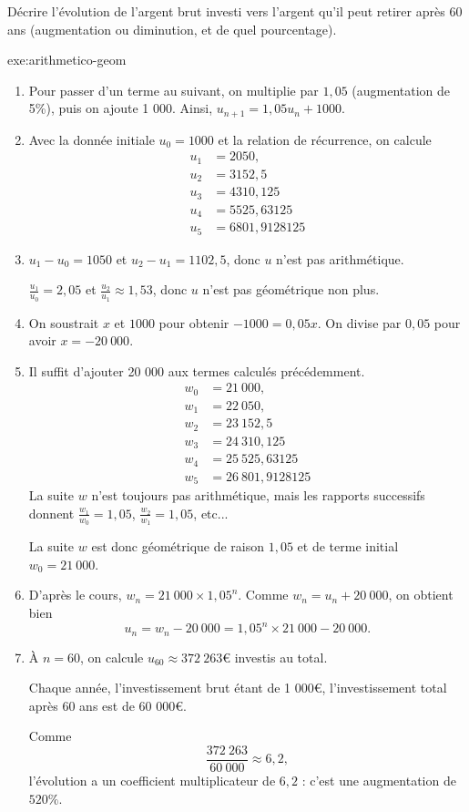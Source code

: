 {\begin{enumerate}[resume]
		Décrire l'évolution de l'argent brut investi vers l'argent qu'il peut retirer après 60 ans (augmentation ou diminution, et de quel pourcentage).
	\end{enumerate}
}{exe:arithmetico-geom}{
	\begin{enumerate}
		\item 
		Pour passer d'un terme au suivant, on multiplie par $1,05$ (augmentation de 5\%), puis on ajoute 1 000.
		Ainsi, $u_{n+1} = 1,05 u_n + 1000$.
		\item 
		Avec la donnée initiale $u_0 = 1000$ et la relation de récurrence, on calcule
			\begin{align*}
				u_1 &= 2050, \\
				u_2 &= 3152,5 \\
				u_3 &= 4310,125 \\
				u_4 &= 5525,63125 \\
				u_5 &= 6801,9128125
			\end{align*}
		\item
		$u_1 - u_0 = 1050$ et $u_2 - u_1 = 1102,5$, donc $u$ n'est pas arithmétique.
		
		$\frac{u_1}{u_0} = 2,05$ et $\frac{u_2}{u_1} \approx 1,53$, donc $u$ n'est pas géométrique non plus.
		\item 
			On soustrait $x$ et $1000$ pour obtenir $-1000 = 0,05 x$.
			On divise par $0,05$ pour avoir $x = -20~000$.
		\item 
		Il suffit d'ajouter 20 000 aux termes calculés précédemment.
			\begin{align*}
				w_0 &= 21~000, \\
				w_1 &= 22~050, \\
				w_2 &= 23~152,5 \\
				w_3 &= 24~310,125 \\
				w_4 &= 25~525,63125 \\
				w_5 &= 26~801,9128125
			\end{align*}
		La suite $w$ n'est toujours pas arithmétique, mais les rapports successifs donnent
		$\frac{w_1}{w_0} = 1,05$, $\frac{w_2}{w_1} = 1,05$, etc...
		
		La suite $w$ est donc géométrique de raison $1,05$ et de terme initial $w_0 = 21~000$.
		\item 
		D'après le cours, $w_n = 21~000 \times 1,05^n$.
		Comme $w_n = u_n + 20~000$, on obtient bien
			\[ u_n = w_n - 20~000 =  1,05^n \times 21~000 - 20~000. \]
		\item
		À $n=60$, on calcule $u_{60} \approx 372~263$€ investis au total.
		
		Chaque année, l'investissement brut étant de 1 000€, l'investissement total après 60 ans est de 60 000€.
		
		Comme 
			\[ \dfrac{372~263}{60~000} \approx 6,2, \]
		l'évolution a un coefficient multiplicateur de $6,2$ : c'est une augmentation de $520\%$.
	\end{enumerate}
}




\newpage
{}
\shipoutAnswer



